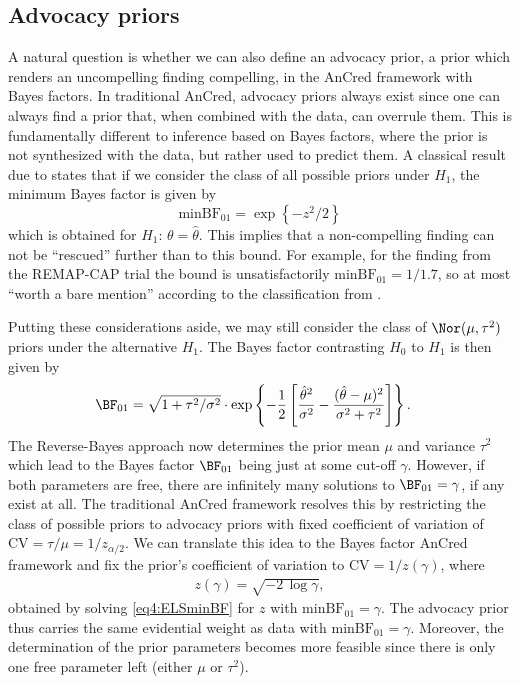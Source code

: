 \subsection{Advocacy priors}
A natural question is whether we can also define an advocacy prior, a prior
which renders an uncompelling finding compelling, in the AnCred framework with
Bayes factors. In traditional AnCred, advocacy priors always exist since one can
always find a prior that, when combined with the data, can overrule them. This
is fundamentally different to inference based on Bayes factors, where the prior
is not synthesized with the data, but rather used to predict them. A classical
result due to \citet{Edwards1963} states that if we consider the class of all
possible priors under $H_1$, the minimum Bayes factor is given by
\begin{equation}\label{eq4:ELSminBF}
  \text{minBF}_{01} = \exp\left\{-z^2/2\right\}
\end{equation}
which is obtained for $H_1$: $\theta = \hat{\theta}$. This implies that a
non-compelling finding can not be ``rescued'' further than to this bound. For
example, for the finding from the REMAP-CAP trial the bound is unsatisfactorily
$\text{minBF}_{01} = 1/1.7$, so at most ``worth a bare mention'' according to
the classification from \citet{Jeffreys1961}.

Putting these considerations aside, we may still consider the class of
$\Nor(\mu, \tau^2)$ priors under the alternative $H_1$. The Bayes factor
contrasting $H_0$ to $H_1$ is then given by
\begin{align*}
  \BF_{01}
  &= \sqrt{1 + \tau^2/\sigma^2} \cdot \exp\left\{-\frac{1}{2}\left[
  \frac{\hat{\theta}^2}{\sigma^2} - \frac{(\hat{\theta} - \mu)^2}{\sigma^2 +
  \tau^2}\right]\right\}.
\end{align*}
The Reverse-Bayes approach now determines the prior mean $\mu$ and variance
$\tau^2$ which lead to the Bayes factor $\BF_{01}$ being just at some cut-off
$\gamma$. However, if both parameters are free, there are infinitely many
solutions to $\BF_{01} = \gamma$, if any exist at all. The traditional AnCred
framework resolves this by restricting the class of possible priors to advocacy
priors with fixed coefficient of variation of
$\text{CV} = \tau/\mu = 1/z_{\alpha/2}$. We can translate this idea to the Bayes
factor AnCred framework and fix the prior's coefficient of variation to
$\text{CV} = 1/z(\gamma)$, where
\begin{align}
  z(\gamma) = \sqrt{- 2 \, \log \gamma}, \label{eq4:zgamma}
\end{align}
obtained by solving \eqref{eq4:ELSminBF} for $z$ with
$\text{minBF}_{01} = \gamma$. The advocacy prior thus carries the same
evidential weight as data with $\text{minBF}_{01} = \gamma$. Moreover, the
determination of the prior parameters becomes more feasible since there is only
one free parameter left (either $\mu$ or $\tau^2$).


